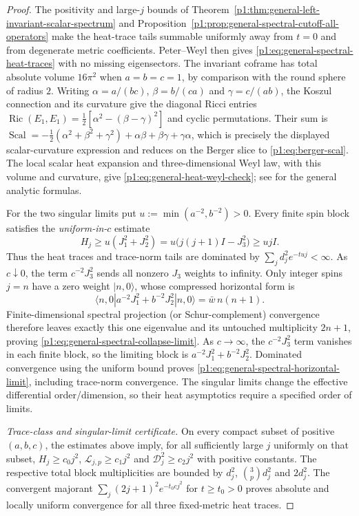 \documentclass[11pt]{article}
\begin{document}
\begin{proof}
The positivity and large-$j$ bounds of
Theorem~\ref{p1:thm:general-left-invariant-scalar-spectrum} and
Proposition~\ref{p1:prop:general-spectral-cutoff-all-operators}
make the heat-trace tails summable uniformly away from $t=0$ and
from degenerate metric coefficients.  Peter--Weyl then gives
\eqref{p1:eq:general-spectral-heat-traces} with no missing eigensectors.
The invariant coframe has total absolute volume $16\pi^2$ when
$a=b=c=1$, by comparison with the round sphere of radius $2$.
Writing $\alpha=a/(bc)$, $\beta=b/(ca)$ and $\gamma=c/(ab)$,
the Koszul connection and its curvature give the diagonal Ricci entries
$\operatorname{Ric}(E_1,E_1)=\tfrac12[\alpha^2-(\beta-\gamma)^2]$
and cyclic permutations.  Their sum is
$\operatorname{Scal}=
 -\tfrac12(\alpha^2+\beta^2+\gamma^2)
 +\alpha\beta+\beta\gamma+\gamma\alpha$,
which is precisely the displayed scalar-curvature expression and reduces
on the Berger slice to \eqref{p1:eq:berger-scal}.  The local scalar heat expansion and
three-dimensional Weyl law, with this volume and curvature, give
\eqref{p1:eq:general-heat-weyl-check}; see
\cite{berline1992heat,Milnor1976} for the general analytic formulas.

For the two singular limits put $u:=\min(a^{-2},b^{-2})>0$.  Every
finite spin block satisfies the \emph{uniform-in-$c$} estimate
\[
 H_j\ge u(J_1^2+J_2^2)
       =u\big(j(j+1)I-J_3^2\big)\ge ujI.
\]
Thus the heat traces and trace-norm tails are dominated by
$\sum_jd_j^2e^{-tuj}<\infty$.  As $c\downarrow0$, the term
$c^{-2}J_3^2$ sends all nonzero $J_3$ weights to infinity.
Only integer spins $j=n$ have a zero weight $|n,0\rangle$, whose
compressed horizontal form is
\[
 \langle n,0|a^{-2}J_1^2+b^{-2}J_2^2|n,0\rangle
       =\bar w\,n(n+1).
\]
Finite-dimensional spectral projection (or Schur-complement)
convergence therefore leaves exactly this one eigenvalue and its
untouched multiplicity $2n+1$, proving
\eqref{p1:eq:general-spectral-collapse-limit}.
As $c\to\infty$, the $c^{-2}J_3^2$ term vanishes in each finite block,
so the limiting block is $a^{-2}J_1^2+b^{-2}J_2^2$.
Dominated convergence using the uniform bound proves
\eqref{p1:eq:general-spectral-horizontal-limit}, including trace-norm
convergence.  The singular limits change the effective differential
order/dimension, so their heat asymptotics require a specified order
of limits.

\emph{Trace-class and singular-limit certificate.}  On every compact
subset of positive $(a,b,c)$, the estimates above imply, for all
sufficiently large $j$ uniformly on that subset,
$H_j\ge c_0j^2$, $\mathscr L_{j,p}\ge c_1j^2$ and
$\mathscr D_j^2\ge c_2j^2$ with positive constants.
The respective total block multiplicities are bounded by
$d_j^2$, $\binom3p d_j^2$ and $2d_j^2$.  The convergent majorant
$\sum_j(2j+1)^2e^{-t_0c j^2}$ for $t\ge t_0>0$
proves absolute and locally uniform convergence for all three
fixed-metric heat traces.


\end{proof}
\end{document}

